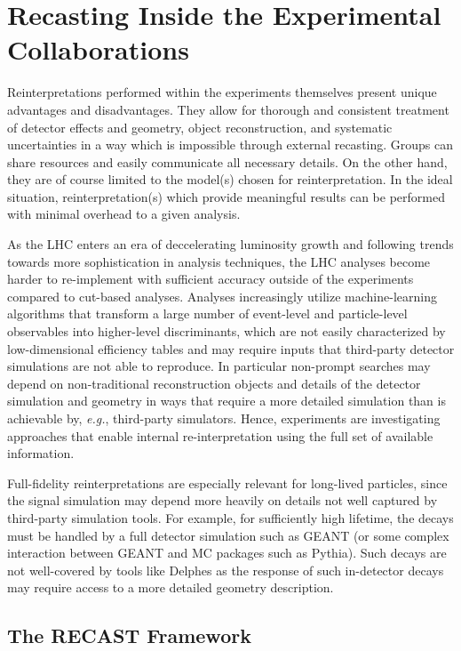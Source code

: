 \section{Recasting Inside the Experimental Collaborations}
\label{sec:ch5-recastingInsideExp}

Reinterpretations performed within the experiments themselves present unique advantages and disadvantages. They allow for thorough and consistent treatment of detector effects and geometry, object reconstruction, and systematic uncertainties in a way which is impossible through external recasting. Groups can share resources and easily communicate all necessary details. On the other hand, they are of course limited to the model(s) chosen for reinterpretation. In the ideal situation, reinterpretation(s) which provide meaningful results can be performed with minimal overhead to a given analysis.

As the LHC enters an era of deccelerating luminosity growth and following  trends towards more sophistication in analysis techniques, the LHC analyses become harder to re-implement with sufficient accuracy outside of the experiments compared to cut-based analyses. Analyses increasingly utilize machine-learning algorithms that transform a large number of event-level and particle-level observables into higher-level discriminants, which are not easily characterized by low-dimensional efficiency tables and may require inputs that third-party detector simulations are not able to reproduce. In particular non-prompt searches may depend on non-traditional reconstruction objects and details of the detector simulation and geometry in ways that require a more detailed simulation than is achievable by, \emph{e.g.}, third-party simulators. Hence, experiments are investigating approaches that enable internal re-interpretation using the full set of available information.

Full-fidelity reinterpretations are  especially relevant for long-lived particles, since the signal simulation may depend more heavily on details not well captured by third-party simulation tools. For example, for sufficiently high lifetime, the decays must be handled by a full detector simulation such as GEANT (or some complex interaction between GEANT and MC packages such as Pythia). Such decays are not well-covered by tools like Delphes as the response of such in-detector decays may require access to a more detailed geometry description.

\subsection{The RECAST Framework}

